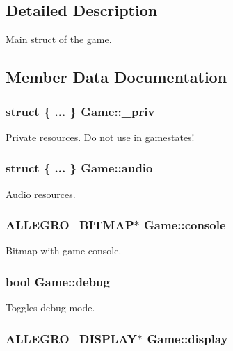 \subsection{Detailed Description}
Main struct of the game. 

\subsection{Member Data Documentation}
\hypertarget{structGame_a2ebba7014575922908ee8cd5b6a92474}{
\subsubsection[{\+\_\+priv}]{\setlength{\rightskip}{0pt plus 5cm}struct \{ ... \}   Game\+::\+\_\+priv}}\label{structGame_a2ebba7014575922908ee8cd5b6a92474}
Private resources. Do not use in gamestates! \hypertarget{structGame_a3cb08c7322ad8e8f61e1a115ec9a14c7}{
\subsubsection[{audio}]{\setlength{\rightskip}{0pt plus 5cm}struct \{ ... \}   Game\+::audio}}\label{structGame_a3cb08c7322ad8e8f61e1a115ec9a14c7}
Audio resources. \hypertarget{structGame_aa2e3d0922374dc870a1aeabf9e3b8ae2}{
\subsubsection[{console}]{\setlength{\rightskip}{0pt plus 5cm}A\+L\+L\+E\+G\+R\+O\+\_\+\+B\+I\+T\+M\+A\+P$\ast$ Game\+::console}}\label{structGame_aa2e3d0922374dc870a1aeabf9e3b8ae2}
Bitmap with game console. \hypertarget{structGame_ad1a3eb5c2d99f8cb9c1f7eb91689af6d}{
\subsubsection[{debug}]{\setlength{\rightskip}{0pt plus 5cm}bool Game\+::debug}}\label{structGame_ad1a3eb5c2d99f8cb9c1f7eb91689af6d}
Toggles debug mode. \hypertarget{structGame_a2bf8ece79fe05b03c31f2e2ede42e5f5}{
\subsubsection[{display}]{\setlength{\rightskip}{0pt plus 5cm}A\+L\+L\+E\+G\+R\+O\+\_\+\+D\+I\+S\+P\+L\+A\+Y$\ast$ Game\+::display}}\label{structGame_a2bf8ece79fe05b03c31f2e2ede42e5f5}
